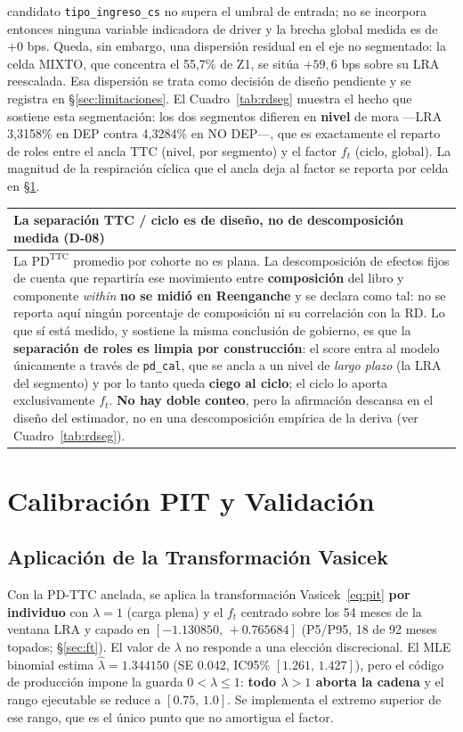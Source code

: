 \documentclass[12pt, a4paper]{article}
\newcommand{\PDTTC}{\ensuremath{\mathrm{PD}^{\mathrm{TTC}}}}
\newcommand{\ft}{\ensuremath{f_t}}
\newenvironment{recuadro}[1]
{\begin{center}\begin{tabular}{|p{0.92\textwidth}|}
\hline
\rowcolor{grissuave}
\textbf{#1} \\ \hline
}
{\\ \hline \end{tabular}\end{center}}
\begin{document}
candidato \texttt{tipo\_ingreso\_cs} no supera el umbral de entrada; no se incorpora entonces
ninguna variable indicadora de driver y la brecha global medida es de $+0$ bps. Queda, sin embargo,
una dispersión residual en el eje no segmentado: la celda MIXTO, que concentra el 55,7\% de Z1, se
sitúa $+59{,}6$ bps sobre su LRA reescalada. Esa dispersión se trata como decisión de diseño
pendiente y se registra en \S\ref{sec:limitaciones}. El Cuadro~\ref{tab:rdseg} muestra el hecho que sostiene
esta segmentación: los dos segmentos difieren en \textbf{nivel} de mora ---LRA 3,3158\% en DEP
contra 4,3284\% en NO DEP---, que es exactamente el reparto de roles entre el
ancla TTC (nivel, por segmento) y el factor $\ft$ (ciclo, global). La magnitud de la respiración
cíclica que el ancla deja al factor se reporta por celda en \S\ref{sec:pit}.

\begin{recuadro}{La separación TTC / ciclo es de diseño, no de descomposición medida (D-08)}
La \PDTTC{} promedio por cohorte no es plana. La descomposición de efectos fijos de cuenta que
repartiría ese movimiento entre \textbf{composición} del libro y componente \emph{within}
\textbf{no se midió en Reenganche} y se declara como tal: no se reporta aquí ningún porcentaje de
composición ni su correlación con la RD. Lo que sí está medido, y sostiene la misma conclusión de
gobierno, es que la \textbf{separación de roles es limpia por construcción}: el score entra al
modelo únicamente a través de \texttt{pd\_cal}, que se ancla a un nivel de \emph{largo plazo} (la
LRA del segmento) y por lo tanto queda \textbf{ciego al ciclo}; el ciclo lo aporta exclusivamente
$\ft$. \textbf{No hay doble conteo}, pero la afirmación descansa en el diseño del estimador, no en
una descomposición empírica de la deriva (ver Cuadro~\ref{tab:rdseg}).
\end{recuadro}

\newpage

\section{Calibración PIT y Validación}
\label{sec:pit}

\subsection{Aplicación de la Transformación Vasicek}
Con la PD-TTC anclada, se aplica la transformación Vasicek~\eqref{eq:pit} \textbf{por individuo}
con $\lambda=1$ (carga plena) y el $\ft$ centrado sobre los 54 meses de la ventana LRA y capado en
$[-1.130850,\,+0.765684]$ (P5/P95, 18 de 92 meses topados; \S\ref{sec:ft}). El valor de $\lambda$ no responde a una
elección discrecional. El MLE binomial estima $\hat\lambda=1.344150$ (SE 0.042, IC95\%
$[1.261,\,1.427]$), pero el código de producción impone la guarda $0<\lambda\le 1$: \textbf{todo
$\lambda>1$ aborta la cadena} y el rango ejecutable se reduce a $[0.75,\,1.0]$. Se implementa el
extremo superior de ese rango, que es el único punto que no amortigua el factor.
\end{document}

